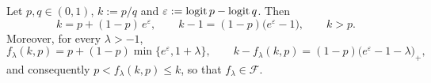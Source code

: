 \begin{lemma}
\label{lem:ratio_identity}
Let $p,q\in(0,1)$, $k:=p/q$ and $\varepsilon:=\operatorname{logit} p-\operatorname{logit} q$. Then
\begin{equation}
k=p+(1-p)\,e^{\varepsilon},
\qquad
k-1=(1-p)\big(e^{\varepsilon}-1\big),
\qquad
k>p .
\label{eq:ratio_identity}
\end{equation}
Moreover, for every $\lambda>-1$,
\begin{equation}
f_\lambda(k,p)=p+(1-p)\min\big\{e^{\varepsilon},1+\lambda\big\},
\qquad
k-f_\lambda(k,p)=(1-p)\big(e^{\varepsilon}-1-\lambda\big)_+,
\label{eq:clipped_identity}
\end{equation}
and consequently $p<f_\lambda(k,p)\le k$, so that $f_\lambda\in\mathcal F$.
\end{lemma}

